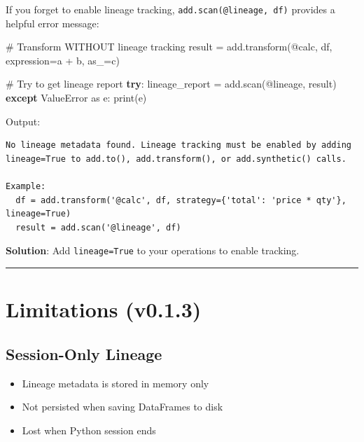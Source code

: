 \documentclass[
  letterpaper,
]{scrbook}
\newenvironment{Shaded}{\begin{snugshade}}{\end{snugshade}}
\newcommand{\BuiltInTok}[1]{\textcolor[rgb]{0.00,0.23,0.31}{#1}}
\newcommand{\CommentTok}[1]{\textcolor[rgb]{0.37,0.37,0.37}{#1}}
\newcommand{\ControlFlowTok}[1]{\textcolor[rgb]{0.00,0.23,0.31}{\textbf{#1}}}
\newcommand{\ImportTok}[1]{\textcolor[rgb]{0.00,0.46,0.62}{#1}}
\newcommand{\NormalTok}[1]{\textcolor[rgb]{0.00,0.23,0.31}{#1}}
\newcommand{\OperatorTok}[1]{\textcolor[rgb]{0.37,0.37,0.37}{#1}}
\newcommand{\PreprocessorTok}[1]{\textcolor[rgb]{0.68,0.00,0.00}{#1}}
\newcommand{\StringTok}[1]{\textcolor[rgb]{0.13,0.47,0.30}{#1}}
\providecommand{\tightlist}{%
  \setlength{\itemsep}{0pt}\setlength{\parskip}{0pt}}
\begin{document}
If you forget to enable lineage tracking,
\texttt{add.scan(\textquotesingle{}@lineage\textquotesingle{},\ df)}
provides a helpful error message:

\begin{Shaded}
\begin{Highlighting}[]
\CommentTok{\# Transform WITHOUT lineage tracking}
\NormalTok{result }\OperatorTok{=}\NormalTok{ add.transform(}\StringTok{\textquotesingle{}@calc\textquotesingle{}}\NormalTok{, df, expression}\OperatorTok{=}\StringTok{\textquotesingle{}a + b\textquotesingle{}}\NormalTok{, as\_}\OperatorTok{=}\StringTok{\textquotesingle{}c\textquotesingle{}}\NormalTok{)}

\CommentTok{\# Try to get lineage report}
\ControlFlowTok{try}\NormalTok{:}
\NormalTok{    lineage\_report }\OperatorTok{=}\NormalTok{ add.scan(}\StringTok{\textquotesingle{}@lineage\textquotesingle{}}\NormalTok{, result)}
\ControlFlowTok{except} \PreprocessorTok{ValueError} \ImportTok{as}\NormalTok{ e:}
    \BuiltInTok{print}\NormalTok{(e)}
\end{Highlighting}
\end{Shaded}

Output:

\begin{verbatim}
No lineage metadata found. Lineage tracking must be enabled by adding
lineage=True to add.to(), add.transform(), or add.synthetic() calls.

Example:
  df = add.transform('@calc', df, strategy={'total': 'price * qty'}, lineage=True)
  result = add.scan('@lineage', df)
\end{verbatim}

\textbf{Solution}: Add \texttt{lineage=True} to your operations to
enable tracking.

\begin{center}\rule{0.5\linewidth}{0.5pt}\end{center}

\section{Limitations (v0.1.3)}\label{limitations-v0.1.3}

\subsection{Session-Only Lineage}\label{session-only-lineage-1}

\begin{itemize}
\tightlist
\item
  Lineage metadata is stored in memory only
\item
  Not persisted when saving DataFrames to disk
\item
  Lost when Python session ends
\end{itemize}
\end{document}
